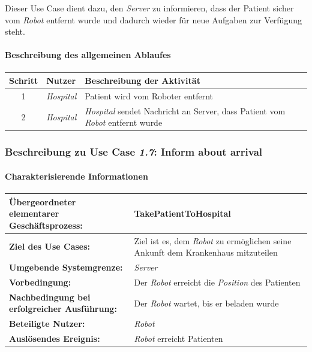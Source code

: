				Dieser Use Case dient dazu, den \emph{Server} zu informieren, dass der Patient sicher vom \emph{Robot} entfernt wurde und dadurch wieder für neue Aufgaben zur Verfügung steht. 
				
				\paragraph*{Beschreibung des allgemeinen Ablaufes}
					\begin{table}[H]
					\centering
					\begin{tabularx}{\textwidth}{|c|p{2cm}|X|}
					\hline
					Schritt & Nutzer & Beschreibung der Aktivität \\ \hline
					1 & \emph{Hospital} & Patient wird vom Roboter entfernt \\
					2 & \emph{Hospital} & \emph{Hospital} sendet Nachricht an {Server}, dass Patient vom \emph{Robot} entfernt wurde \\
					\hline
					\end{tabularx}
				\end{table}
		
		\subsubsection{Beschreibung zu Use Case \emph{1.7}: Inform about arrival}

			\paragraph*{Charakterisierende Informationen}

			\begin{table}[H]
				\centering
				\begin{tabularx}{\textwidth}{|p{5cm}|X|}
				\hline
				\textbf{Übergeordneter elementarer Geschäftsprozess:} & TakePatientToHospital\\ \hline
				\textbf{Ziel des Use Cases:} & Ziel ist es, dem \emph{Robot} zu ermöglichen seine Ankunft dem Krankenhaus mitzuteilen\\ \hline
				\textbf{Umgebende Systemgrenze:} & \emph{Server}\\ \hline
				\textbf{Vorbedingung:} & Der \emph{Robot} erreicht die \emph{Position} des Patienten\\ \hline
				\textbf{Nachbedingung bei erfolgreicher Ausführung:} & Der \emph{Robot} wartet, bis er beladen wurde\\ \hline
				\textbf{Beteiligte Nutzer:} & \emph{Robot}\\ \hline
				\textbf{Auslösendes Ereignis:} & \emph{Robot} erreicht Patienten\\
				\hline
				\end{tabularx}
			\end{table}

